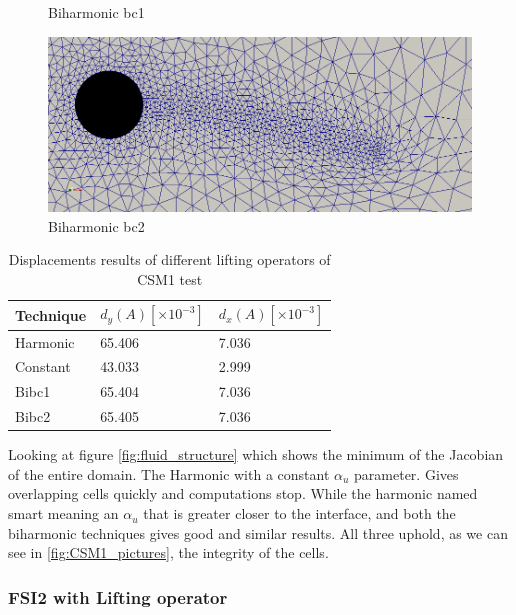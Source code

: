 \begin{figure}[H]
\begin{minipage}[b]{0.6\linewidth}
    \caption{Biharmonic bc1} 
    \vspace{4ex}
  \end{minipage}%
  \begin{minipage}[b]{0.6\linewidth}
    \centering
    \includegraphics[scale=0.25]{./Verification_Validation/Mesh_motion_results/CSM1_bibc2.png} 
    \caption{Biharmonic bc2} 
    \vspace{4ex}
  \end{minipage} 
\end{figure}



\begin{table}[H]
\centering
\caption{Displacements results of different lifting operators of CSM1 test}
\label{my-label}
\begin{tabular}{|l|l|l|}
\hline
Technique & $d_y(A) [\times 10^{-3}]$ & $d_x(A) [\times 10^{-3}]$ \\ \hline
Harmonic & 65.406 & 7.036 \\ \hline
Constant & 43.033 & 2.999 \\ \hline
Bibc1 & 65.404 & 7.036 \\ \hline
Bibc2 & 65.405 & 7.036 \\ \hline
\end{tabular}
\end{table}


Looking at figure \ref{fig:fluid_structure} which shows the minimum of the Jacobian of the entire domain. The Harmonic with a constant $\alpha_u$ parameter. Gives overlapping cells quickly and computations stop.
While the harmonic named smart meaning an $\alpha_u$ that is greater closer to the interface, and both the biharmonic techniques gives good and similar results. All three uphold, as we can see in \ref{fig:CSM1_pictures}, the integrity of the cells.


\subsubsection{FSI2 with Lifting operator}

